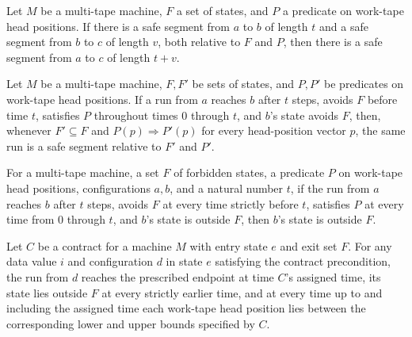 \begin{theorem}
\label{Turing.SafeSegment.trans}
\leanok
{}
Let $M$ be a multi-tape machine, $F$ a set of states, and $P$ a predicate on work-tape
head positions. If there is a safe segment from $a$ to $b$ of length $t$ and a safe
segment from $b$ to $c$ of length $v$, both relative to $F$ and $P$, then there is a
safe segment from $a$ to $c$ of length $t+v$.
\end{theorem}

\begin{theorem}
\label{Turing.SafeSegment.mono}
\leanok
{}
Let $M$ be a multi-tape machine, $F,F'$ be sets of states, and $P,P'$ be predicates on
work-tape head positions. If a run from $a$ reaches $b$ after $t$ steps, avoids $F$
before time $t$, satisfies $P$ throughout times $0$ through $t$, and $b$'s state avoids
$F$, then, whenever $F'\subseteq F$ and $P(p)\Rightarrow P'(p)$ for every head-position
vector $p$, the same run is a safe segment relative to $F'$ and $P'$.
\end{theorem}

\begin{theorem}
\label{Turing.SafeSegment.endpoint_not_mem}
\leanok
{}
For a multi-tape machine, a set $F$ of forbidden states, a predicate $P$ on work-tape
head positions, configurations $a,b$, and a natural number $t$, if the run from $a$
reaches $b$ after $t$ steps, avoids $F$ at every time strictly before $t$, satisfies $P$
at every time from $0$ through $t$, and $b$'s state is outside $F$, then $b$'s state is
outside $F$.
\end{theorem}

\begin{theorem}
\label{Turing.Contract.segment}
\leanok
{}
Let $C$ be a contract for a machine $M$ with entry state $e$ and exit set $F$. For any
data value $i$ and configuration $d$ in state $e$ satisfying the contract precondition,
the run from $d$ reaches the prescribed endpoint at time $C$’s assigned time, its state
lies outside $F$ at every strictly earlier time, and at every time up to and including
the assigned time each work-tape head position lies between the corresponding lower and
upper bounds specified by $C$.
\end{theorem}


